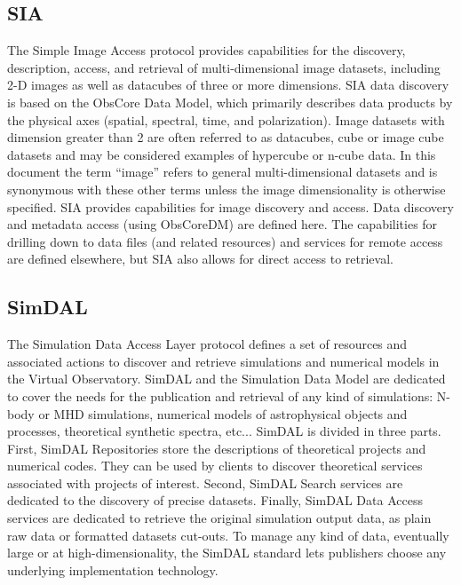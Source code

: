 \documentclass[11pt,a4paper]{ivoa}
\begin{document}
\subsection{SIA}

The Simple Image Access protocol provides capabilities for the discovery, description, 
access, and retrieval of multi-dimensional image datasets, including 2-D images as well 
as datacubes of three or more dimensions. SIA data discovery is based on the ObsCore Data 
Model, which primarily describes data products by the physical axes (spatial, spectral, 
time, and polarization). Image datasets with dimension greater than 2 are often referred 
to as datacubes, cube or image cube datasets and may be considered examples of hypercube 
or n-cube data. In this document the term “image” refers to general multi-dimensional 
datasets and is synonymous with these other terms unless the image dimensionality is 
otherwise specified. SIA provides capabilities for image discovery and access. Data 
discovery and metadata access (using ObsCoreDM) are defined here. The capabilities for 
drilling down to data files (and related resources) and services for remote access are 
defined elsewhere, but SIA also allows for direct access to retrieval. 

\subsection{SimDAL}

The Simulation Data Access Layer protocol defines a set of resources and associated 
actions to discover and retrieve simulations and numerical models in the Virtual Observatory. 
SimDAL and the Simulation Data Model are dedicated to cover the needs for the publication 
and retrieval of any kind of simulations: N-body or MHD simulations, numerical models of 
astrophysical objects and processes, theoretical synthetic spectra, etc... SimDAL is 
divided in three parts. First, SimDAL Repositories store the descriptions of theoretical 
projects and numerical codes. They can be used by clients to discover theoretical 
services associated with projects of interest. Second, SimDAL Search services are 
dedicated to the discovery of precise datasets. Finally, SimDAL Data Access services 
are dedicated to retrieve the original simulation output data, as plain raw data or 
formatted datasets cut-outs. To manage any kind of data, eventually large or at 
high-dimensionality, the SimDAL standard lets publishers choose any underlying 
implementation technology. 
\end{document}
